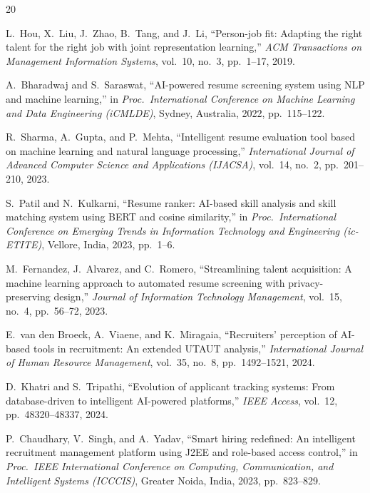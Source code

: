 \documentclass[12pt,a4paper]{report}
\begin{document}
\begin{thebibliography}{20}

L.~Hou, X.~Liu, J.~Zhao, B.~Tang, and J.~Li,
``Person-job fit: Adapting the right talent for the right job with joint representation learning,''
\textit{ACM Transactions on Management Information Systems}, vol.~10, no.~3, pp.~1--17, 2019.

A.~Bharadwaj and S.~Saraswat,
``AI-powered resume screening system using NLP and machine learning,''
in \textit{Proc.\ International Conference on Machine Learning and Data Engineering (iCMLDE)}, Sydney, Australia, 2022, pp.~115--122.

R.~Sharma, A.~Gupta, and P.~Mehta,
``Intelligent resume evaluation tool based on machine learning and natural language processing,''
\textit{International Journal of Advanced Computer Science and Applications (IJACSA)}, vol.~14, no.~2, pp.~201--210, 2023.

S.~Patil and N.~Kulkarni,
``Resume ranker: AI-based skill analysis and skill matching system using BERT and cosine similarity,''
in \textit{Proc.\ International Conference on Emerging Trends in Information Technology and Engineering (ic-ETITE)}, Vellore, India, 2023, pp.~1--6.

M.~Fernandez, J.~Alvarez, and C.~Romero,
``Streamlining talent acquisition: A machine learning approach to automated resume screening with privacy-preserving design,''
\textit{Journal of Information Technology Management}, vol.~15, no.~4, pp.~56--72, 2023.

E.~van den Broeck, A.~Viaene, and K.~Miragaia,
``Recruiters' perception of AI-based tools in recruitment: An extended UTAUT analysis,''
\textit{International Journal of Human Resource Management}, vol.~35, no.~8, pp.~1492--1521, 2024.

D.~Khatri and S.~Tripathi,
``Evolution of applicant tracking systems: From database-driven to intelligent AI-powered platforms,''
\textit{IEEE Access}, vol.~12, pp.~48320--48337, 2024.

P.~Chaudhary, V.~Singh, and A.~Yadav,
``Smart hiring redefined: An intelligent recruitment management platform using J2EE and role-based access control,''
in \textit{Proc.\ IEEE International Conference on Computing, Communication, and Intelligent Systems (ICCCIS)}, Greater Noida, India, 2023, pp.~823--829.


\end{thebibliography}
\end{document}
